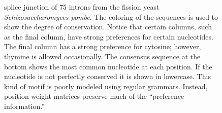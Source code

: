 \begin{figure}
{             splice junction of 75 introns from the fission yeast \emph{Schizosaccharomyces pombe}.
             The coloring of the sequences is used to show the
             degree of conservation.  Notice that certain columns,
             such as the final column, have strong preferences for
             certain nucleotides.  The final column has a strong
             preference for cytosine; however, thymine is allowed
             occasionally.  The consensus sequence at the bottom
             shows the most common nucleotide at each position.  If
             the nucleotide is not perfectly conserved it is shown in
             lowercase.  This kind of motif is poorly modeled using
             regular grammars.  Instead, position weight matrices
             preserve much of the ``preference information.''
            }
            \label{fig:yeast}
            \end{figure}

